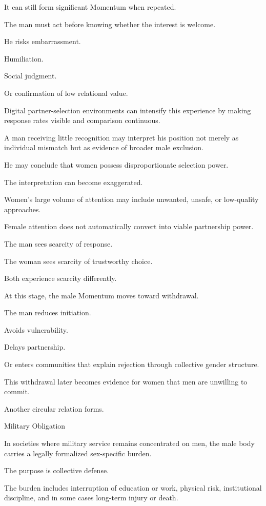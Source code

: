 It can still form significant Momentum when repeated.

The man must act before knowing whether the interest is welcome.

He risks embarrassment.

Humiliation.

Social judgment.

Or confirmation of low relational value.

Digital partner-selection environments can intensify this experience by making response rates visible and comparison continuous.

A man receiving little recognition may interpret his position not merely as individual mismatch but as evidence of broader male exclusion.

He may conclude that women possess disproportionate selection power.

The interpretation can become exaggerated.

Women’s large volume of attention may include unwanted, unsafe, or low-quality approaches.

Female attention does not automatically convert into viable partnership power.

The man sees scarcity of response.

The woman sees scarcity of trustworthy choice.

Both experience scarcity differently.

At this stage, the male Momentum moves toward withdrawal.

The man reduces initiation.

Avoids vulnerability.

Delays partnership.

Or enters communities that explain rejection through collective gender structure.

This withdrawal later becomes evidence for women that men are unwilling to commit.

Another circular relation forms.

Military Obligation

In societies where military service remains concentrated on men, the male body carries a legally formalized sex-specific burden.

The purpose is collective defense.

The burden includes interruption of education or work, physical risk, institutional discipline, and in some cases long-term injury or death.

